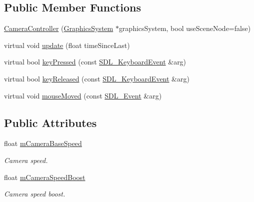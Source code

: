 \subsection*{Public Member Functions}
\begin{DoxyCompactItemize}
\item 
\hyperlink{class_common_1_1_camera_controller_a09c9f866ac2161de31ff45694dd711fd}{Camera\+Controller} (\hyperlink{class_common_1_1_graphics_system}{Graphics\+System} $\ast$graphics\+System, bool use\+Scene\+Node=false)
\item 
virtual void \hyperlink{class_common_1_1_camera_controller_a5d11cbced7f78eec997b96bb489d0806}{update} (float time\+Since\+Last)
\item 
virtual bool \hyperlink{class_common_1_1_camera_controller_aefb0839a3f45e4390c764762b7a053a1}{key\+Pressed} (const \hyperlink{struct_s_d_l___keyboard_event}{S\+D\+L\+\_\+\+Keyboard\+Event} \&arg)
\item 
virtual bool \hyperlink{class_common_1_1_camera_controller_a2ade17644b5c6a9249b6fcff6c358b2e}{key\+Released} (const \hyperlink{struct_s_d_l___keyboard_event}{S\+D\+L\+\_\+\+Keyboard\+Event} \&arg)
\item 
virtual void \hyperlink{class_common_1_1_camera_controller_af56a45fb24b5c2e5603210be8377aa8d}{mouse\+Moved} (const \hyperlink{union_s_d_l___event}{S\+D\+L\+\_\+\+Event} \&arg)
\end{DoxyCompactItemize}
\subsection*{Public Attributes}
\begin{DoxyCompactItemize}
\item 
\mbox{\label{class_common_1_1_camera_controller_a89119788b0320e34bd0322006bbd9734}} 
float \hyperlink{class_common_1_1_camera_controller_a89119788b0320e34bd0322006bbd9734}{m\+Camera\+Base\+Speed}
\begin{DoxyCompactList}\small\item\em Camera speed. \end{DoxyCompactList}\item 
\mbox{\label{class_common_1_1_camera_controller_a043ce9247c01a9cc852b7e58e0b46e06}} 
float \hyperlink{class_common_1_1_camera_controller_a043ce9247c01a9cc852b7e58e0b46e06}{m\+Camera\+Speed\+Boost}
\begin{DoxyCompactList}\small\item\em Camera speed boost. \end{DoxyCompactList}\end{DoxyCompactItemize}
